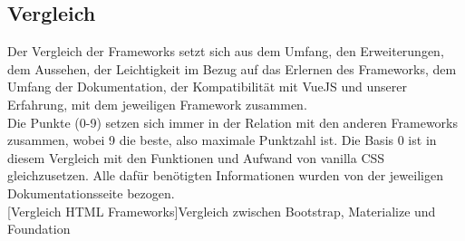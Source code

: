 	\subsection{Vergleich}
	\label{chapter:study-frontend-vergleich}
	Der Vergleich der Frameworks setzt sich aus dem Umfang, den Erweiterungen, dem Aussehen, der Leichtigkeit im Bezug auf das Erlernen des Frameworks, dem Umfang der Dokumentation, der Kompatibilität mit VueJS und unserer Erfahrung, mit dem jeweiligen Framework zusammen.\\
	Die Punkte (0-9) setzen sich immer in der Relation mit den anderen Frameworks zusammen, wobei 9 die beste, also maximale Punktzahl ist. Die Basis 0 ist in diesem Vergleich mit den Funktionen und Aufwand von vanilla CSS gleichzusetzen. Alle dafür benötigten Informationen wurden von der jeweiligen Dokumentationsseite bezogen.
	~\\
	[Vergleich HTML Frameworks]{Vergleich zwischen Bootstrap, Materialize und Foundation}\label{tbl:comparison}
